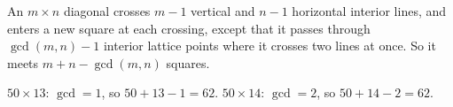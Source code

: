 An $m\times n$ diagonal crosses $m-1$ vertical and $n-1$ horizontal interior lines, and enters a new square at each crossing, except that it passes through $\gcd(m,n)-1$ interior lattice points where it crosses two lines at once. So it meets $m+n-\gcd(m,n)$ squares.

$50\times13$: $\gcd=1$, so $50+13-1=\boxed{62}$. $50\times14$: $\gcd=2$, so $50+14-2=\boxed{62}$.
